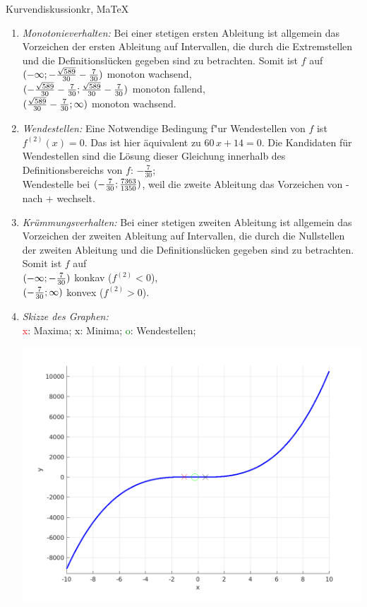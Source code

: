 \begin{MAufgabe}{Kurvendiskussion}{kr, MaTeX}
\begin{enumerate}
 \item \emph{Monotonieverhalten:} 
 Bei einer stetigen ersten Ableitung ist allgemein das Vorzeichen der ersten Ableitung auf Intervallen, die durch die Extremstellen und die Definitionsl\"ucken gegeben sind zu betrachten. Somit ist $f$ auf \\ 
 $(-\infty; - \frac{\sqrt{589}}{30} - \frac{7}{30})$ monoton wachsend, \\ 
 $( - \frac{\sqrt{589}}{30} - \frac{7}{30};\frac{\sqrt{589}}{30} - \frac{7}{30})$ monoton  fallend, \\ 
 $(\frac{\sqrt{589}}{30} - \frac{7}{30}; \infty)$ monoton wachsend. \\ 
 \item \emph{Wendestellen:} 
 Eine Notwendige Bedingung f"ur Wendestellen von $f$ ist $f^{(2)}(x)=0$. 
 Das ist hier \"aquivalent zu $60\, x + 14=0$. 
 Die Kandidaten f\"ur Wendestellen sind die L\"osung dieser Gleichung innerhalb des Definitionsbereichs von $f$: $- \frac{7}{30}$; \\ 
 Wendestelle bei $(- \frac{7}{30};\frac{7363}{1350})$, weil die zweite Ableitung das Vorzeichen von - nach + wechselt. \\ 
 \item \emph{Kr\"ummungsverhalten:} 
 Bei einer stetigen zweiten Ableitung ist allgemein das Vorzeichen der zweiten Ableitung auf Intervallen, die durch die Nullstellen der zweiten Ableitung und die Definitionsl\"ucken gegeben sind zu betrachten. 
 Somit ist $f$ auf \\ 
 $(-\infty ;- \frac{7}{30})$  konkav ($f^{(2)}<0$), \\ 
 $(- \frac{7}{30}; \infty)$  konvex ($f^{(2)}>0$). \\ 
 \item \emph{Skizze des Graphen:} \\ 
 {\textcolor{red} x}: Maxima; {\textcolor{black} x}: Minima; {\textcolor{green} o}: Wendestellen; 
  \begin{center}
  \includegraphics[width=0.8\linewidth]{Abb_zur_Ag_autogenerated_fractions_32.png} \end{center}
  
 \end{enumerate}
 \else\relax\fi
  \end{MAufgabe}